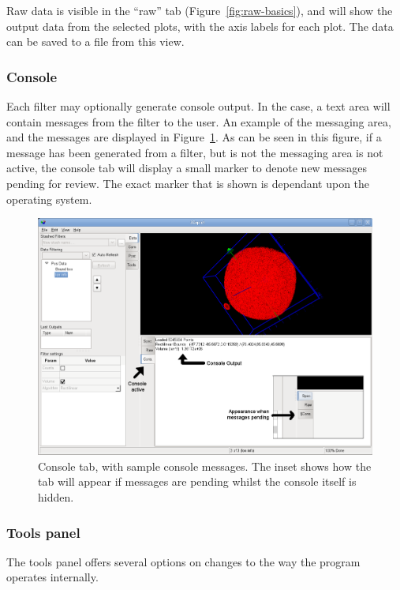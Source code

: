 \documentclass[10pt]{article}
\begin{document}
Raw data is visible in the ``raw'' tab (Figure~\ref{fig:raw-basics}), and will show the output data from the selected plots, with the axis labels for each plot. The data can be saved to a file from this view.



\subsubsection{Console}
Each filter may optionally generate console output. In the case, a text area will contain messages from the filter to the user. An example of the messaging area, and the messages are displayed in Figure~\ref{fig:console-basics}. As can be seen in this figure, if a message has been generated from a filter, but is not the messaging area is not active, the console tab will display a small marker to denote new messages pending for review. The exact marker that is shown is dependant upon the operating system.

\begin{figure}[ht]
\centering
 \includegraphics[width=0.85 \textwidth,keepaspectratio=true]{./figures/console.png}

 \caption{Console tab, with sample console messages. The inset shows how the tab will appear if messages are pending whilst the console itself is hidden.}
\label{fig:console-basics}
\end{figure}


\subsubsection{Tools panel}
The tools panel offers several options on changes to the way the program operates internally. 
\end{document}
